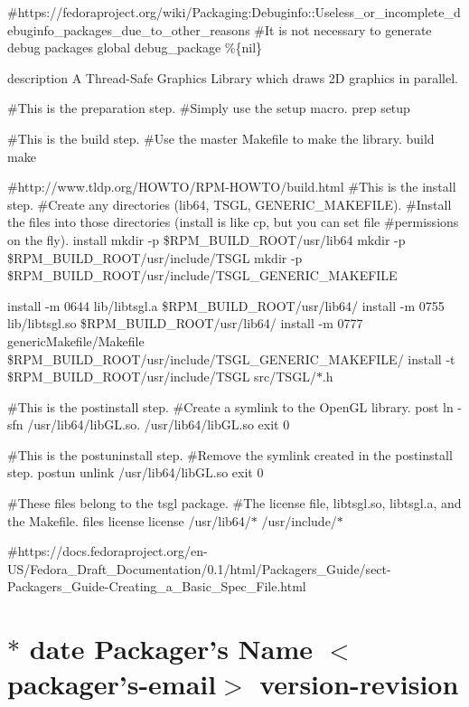 \#https\-://fedoraproject.org/wiki/\-Packaging\-:Debuginfo\-::\-Useless\-\_\-or\-\_\-incomplete\-\_\-debuginfo\-\_\-packages\-\_\-due\-\_\-to\-\_\-other\-\_\-reasons \#\-It is not necessary to generate debug packages global debug\-\_\-package \%\{nil\}

description A Thread-\/\-Safe Graphics Library which draws 2\-D graphics in parallel.

\#\-This is the preparation step. \#\-Simply use the setup macro. prep setup

\#\-This is the build step. \#\-Use the master Makefile to make the library. build make

\#http\-://www.tldp.\-org/\-H\-O\-W\-T\-O/\-R\-P\-M-\/\-H\-O\-W\-T\-O/build.html \#\-This is the install step. \#\-Create any directories (lib64, T\-S\-G\-L, G\-E\-N\-E\-R\-I\-C\-\_\-\-M\-A\-K\-E\-F\-I\-L\-E). \#\-Install the files into those directories (install is like cp, but you can set file \#permissions on the fly). install mkdir -\/p \$\-R\-P\-M\-\_\-\-B\-U\-I\-L\-D\-\_\-\-R\-O\-O\-T/usr/lib64 mkdir -\/p \$\-R\-P\-M\-\_\-\-B\-U\-I\-L\-D\-\_\-\-R\-O\-O\-T/usr/include/\-T\-S\-G\-L mkdir -\/p \$\-R\-P\-M\-\_\-\-B\-U\-I\-L\-D\-\_\-\-R\-O\-O\-T/usr/include/\-T\-S\-G\-L\-\_\-\-G\-E\-N\-E\-R\-I\-C\-\_\-\-M\-A\-K\-E\-F\-I\-L\-E

install -\/m 0644 lib/libtsgl.\-a \$\-R\-P\-M\-\_\-\-B\-U\-I\-L\-D\-\_\-\-R\-O\-O\-T/usr/lib64/ install -\/m 0755 lib/libtsgl.\-so \$\-R\-P\-M\-\_\-\-B\-U\-I\-L\-D\-\_\-\-R\-O\-O\-T/usr/lib64/ install -\/m 0777 generic\-Makefile/\-Makefile \$\-R\-P\-M\-\_\-\-B\-U\-I\-L\-D\-\_\-\-R\-O\-O\-T/usr/include/\-T\-S\-G\-L\-\_\-\-G\-E\-N\-E\-R\-I\-C\-\_\-\-M\-A\-K\-E\-F\-I\-L\-E/ install -\/t \$\-R\-P\-M\-\_\-\-B\-U\-I\-L\-D\-\_\-\-R\-O\-O\-T/usr/include/\-T\-S\-G\-L src/\-T\-S\-G\-L/$\ast$.h

\#\-This is the postinstall step. \#\-Create a symlink to the Open\-G\-L library. post ln -\/sfn /usr/lib64/lib\-G\-L.so. /usr/lib64/lib\-G\-L.so exit 0

\#\-This is the postuninstall step. \#\-Remove the symlink created in the postinstall step. postun unlink /usr/lib64/lib\-G\-L.so exit 0

\#\-These files belong to the tsgl package. \#\-The license file, libtsgl.\-so, libtsgl.\-a, and the Makefile. files license license /usr/lib64/$\ast$ /usr/include/$\ast$

\#https\-://docs.fedoraproject.\-org/en-\/\-U\-S/\-Fedora\-\_\-\-Draft\-\_\-\-Documentation/0.1/html/\-Packagers\-\_\-\-Guide/sect-\/\-Packagers\-\_\-\-Guide-\/\-Creating\-\_\-a\-\_\-\-Basic\-\_\-\-Spec\-\_\-\-File.\-html \section*{$\ast$ date Packager's Name $<$packager's-\/email$>$ version-\/revision}

